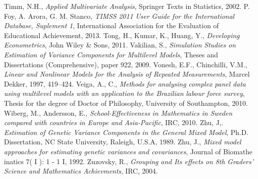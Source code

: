 \documentclass[12pt,a4paper]{article}
\begin{document}
\begin{thebibliography}{1}
Timm, N.H., \textit{Applied Multivariate Analysis}, Springer Texts in Statistics, 2002.
 P. Foy, A. Arora, G. M. Stanco, \textit{TIMSS 2011 User Guide for the International Database, Suplement 1}, International Association for the Evaluation of Educational Achievement, 2013.
 Tong, H., Kumar, K., Huang, Y., \textit{Developing Econometrics}, John Wiley \& Sons, 2011.
 Vakilian, S., \textit{Simulation Studies on Estimation of Variance Components for Multilevel Models}, Theses and Dissertations (Comprehensive), paper 922, 2009.
 Vonesh, E.F., Chinchilli, V.M., \textit{ Linear and Nonlinear Models for the Analysis of Repeated Measurements}, Marcel Dekker, 1997, 419–424.
 Veiga, A., C., \textit{Methods for analysing complex panel data using multilevel models with an application to the Brazilian labour force survey}, Thesis for the degree of Doctor of Philosophy, University of Southampton, 2010.
 Wiberg, M., Andersson, E., \textit{School-Effectiveness in Mathematics in Sweden compared with countries in Europe and Asia-Pacific}, IRC, 2010.
 Zhu, J,. \textit{Estimation of Genetic Variance Components in the General Mixed Model},  Ph.D.
Dissertation, NC State University, Raleigh, U.S.A, 1989.   
 Zhu, J.,  \textit{Mixed model approaches for estimating genetic variances and covariances}, Journal of Biomathe inatics 7( I ): 1 - 1 I, 1992.
 Zuzovsky, R., \textit{Grouping and Its effects on 8th Graders' Science and Mathematics Achievments}, IRC, 2004.
\end{thebibliography}
\end{document}
